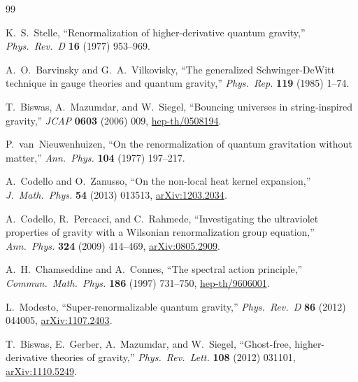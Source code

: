 \documentclass[11pt,a4paper]{article}
\theoremstyle{plain}
\theoremstyle{definition}
\begin{document}
\begin{thebibliography}{99}

K.~S.~Stelle,
``Renormalization of higher-derivative quantum gravity,''
\emph{Phys.\ Rev.\ D} \textbf{16} (1977) 953--969.

A.~O.~Barvinsky and G.~A.~Vilkovisky,
``The generalized Schwinger-DeWitt technique in gauge theories and
quantum gravity,''
\emph{Phys.\ Rep.} \textbf{119} (1985) 1--74.

T.~Biswas, A.~Mazumdar, and W.~Siegel,
``Bouncing universes in string-inspired gravity,''
\emph{JCAP} \textbf{0603} (2006) 009,
\href{https://arxiv.org/abs/hep-th/0508194}{hep-th/0508194}.

P.~van~Nieuwenhuizen,
``On the renormalization of quantum gravitation without matter,''
\emph{Ann.\ Phys.} \textbf{104} (1977) 197--217.

A.~Codello and O.~Zanusso,
``On the non-local heat kernel expansion,''
\emph{J.\ Math.\ Phys.} \textbf{54} (2013) 013513,
\href{https://arxiv.org/abs/1203.2034}{arXiv:1203.2034}.

A.~Codello, R.~Percacci, and C.~Rahmede,
``Investigating the ultraviolet properties of gravity with a
Wilsonian renormalization group equation,''
\emph{Ann.\ Phys.} \textbf{324} (2009) 414--469,
\href{https://arxiv.org/abs/0805.2909}{arXiv:0805.2909}.

A.~H.~Chamseddine and A.~Connes,
``The spectral action principle,''
\emph{Commun.\ Math.\ Phys.} \textbf{186} (1997) 731--750,
\href{https://arxiv.org/abs/hep-th/9606001}{hep-th/9606001}.

L.~Modesto,
``Super-renormalizable quantum gravity,''
\emph{Phys.\ Rev.\ D} \textbf{86} (2012) 044005,
\href{https://arxiv.org/abs/1107.2403}{arXiv:1107.2403}.

T.~Biswas, E.~Gerber, A.~Mazumdar, and W.~Siegel,
``Ghost-free, higher-derivative theories of gravity,''
\emph{Phys.\ Rev.\ Lett.} \textbf{108} (2012) 031101,
\href{https://arxiv.org/abs/1110.5249}{arXiv:1110.5249}.

\end{thebibliography}
\end{document}
